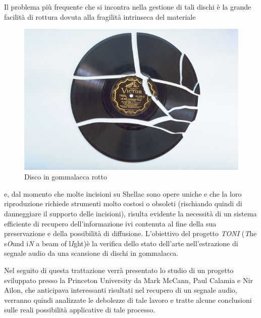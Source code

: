 Il problema pi\`u frequente che si incontra nella gestione di tali dischi \`e la grande facilit\`a di rottura dovuta alla fragilit\`a intrinseca del materiale
\begin{figure}[h!t]
\begin{center}
\includegraphics[scale=0.4]{./img/broken_disc.jpg}
\caption{Disco in gommalacca rotto}
\end{center}
\end{figure}
 e, dal momento che molte incisioni su Shellac sono opere uniche e che la loro riproduzione richiede strumenti molto costosi o obsoleti (rischiando quindi di danneggiare il supporto delle incisioni), risulta evidente la necessit\`a di un sistema efficiente di recupero dell'informazione ivi contenuta al fine della sua preservazione e della possibilit\`a di diffusione.
L'obiettivo del progetto \emph{TONI} (\emph{T}he s\emph{O}und i\emph{N} a beam of l\emph{I}ght)\`e la verifica dello stato dell'arte nell'estrazione di segnale audio da una scansione di dischi in gommalacca.

Nel seguito di questa trattazione verr\`a presentato lo studio di un progetto sviluppato presso la Princeton University da Mark McCann, Paul Calamia e Nir Ailon, che anticipava interessanti risultati nel recupero di un segnale audio, verranno quindi analizzate le debolezze di tale lavoro e tratte alcune conclusioni sulle reali possibilit\`a applicative di tale processo.

% 
% 
